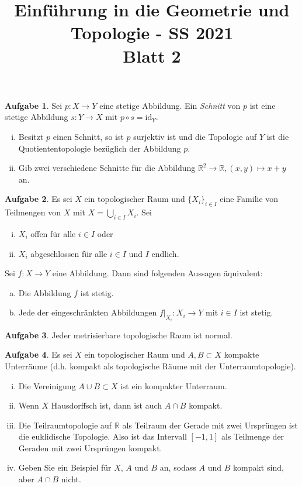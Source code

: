 \documentclass{article}
\title{Einführung in die Geometrie und Topologie - SS 2021\\
Blatt 2}
\date{}
\theoremstyle{definition}
\newtheorem{aufgabe}{Aufgabe}
\theoremstyle{remark}
\newcommand{\id}{\mathrm{id}}
\newcommand{\R}{\mathbb{R}}
\def\id{\mathrm{id}}\def\Id{\mathrm{Id}}
\begin{document}
\maketitle
\thispagestyle{fancy}
\cfoot{}
\renewcommand{\headrulewidth}{0pt}
\renewcommand{\footrulewidth}{0.4pt}
\begin{aufgabe}
	Sei $p\colon X\to Y$ eine stetige Abbildung. Ein \emph{Schnitt} von $p$ ist eine stetige Abbildung $s\colon Y\to X$ mit $p\circ s=\id_Y$.
	\begin{enumerate}[i)]
		\item Besitzt $p$ einen Schnitt, so ist $p$ surjektiv ist und die Topologie auf $Y$ ist die Quotiententopologie bezüglich der Abbildung $p$.
		\item Gib zwei verschiedene Schnitte für die Abbildung $\R^2\to \R,(x,y)\mapsto x+y$ an.
	\end{enumerate}
\end{aufgabe}

\begin{aufgabe}\label{Aufgabe:Abbildungen_auf_Teilmengen}
	Es sei $X$ ein topologischer Raum und $\{X_i\}_{i\in I}$ eine Familie von Teilmengen von $X$ mit $X=\bigcup_{i\in I} X_i$.
	Sei
	\begin{enumerate}[i)]
		\item $X_i$ offen für alle $i\in I$ oder
		\item $X_i$ abgeschlossen für alle $i\in I$ und $I$ endlich.
	\end{enumerate}
	Sei $f\colon X\to Y$ eine Abbildung. Dann sind folgenden Aussagen äquivalent:
	\begin{enumerate}[a)]
		\item Die Abbildung $f$ ist stetig.
		\item Jede der eingeschränkten Abbildungen $f\vert_{X_i} \colon X_i \rightarrow Y$
		mit $i \in I$ ist stetig.
	\end{enumerate}
\end{aufgabe}

\begin{aufgabe}
	Jeder metrisierbare topologische Raum ist normal.
\end{aufgabe}

\begin{aufgabe}
	Es sei $X$ ein topologischer Raum und $A, B\subset X$ kompakte Unterräume (d.h. kompakt als topologische Räume mit der Unterraumtopologie).
	\begin{enumerate}[i)]
		\item Die Vereinigung $A\cup B\subset X$ ist ein kompakter Unterraum.
		\item Wenn $X$ Hausdorffsch ist, dann ist auch $A\cap B$ kompakt.
		\item Die Teilraumtopologie auf $\R$ als Teilraum der Gerade mit zwei Ursprüngen ist die euklidische Topologie. Also ist das Intervall $[-1,1]$ als Teilmenge der Geraden mit zwei Ursprüngen kompakt.
		\item Geben Sie ein Beispiel für $X$, $A$ und $B$ an, sodass $A$ und $B$ kompakt sind, aber $A\cap B$ nicht.
	\end{enumerate}
\end{aufgabe}
\end{document}
